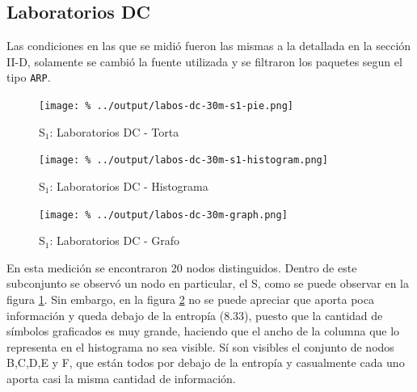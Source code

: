 \documentclass[final,inline,a4paper,narroweqnarray]{ieee}
\begin{document}
  \subsection{Laboratorios DC}

  Las condiciones en las que se midió fueron las mismas a la detallada
  en la sección II-D, solamente se cambió la fuente utilizada y se
  filtraron los paquetes segun el tipo \texttt{ARP}.

    \begin{figure}[H]\begin{center}
      \texttt{[image: \%
      ../output/labos-dc-30m-s1-pie.png]}
      \vspace{-2em}
      \caption{S$_1$: Laboratorios DC - Torta}
      \label{labos-dc-30m-s1-pie}
    \end{center}\end{figure}

    \begin{figure}[H]\begin{center}
      \texttt{[image: \%
      ../output/labos-dc-30m-s1-histogram.png]}
      \caption{S$_1$: Laboratorios DC - Histograma}
      \label{labos-dc-30m-s1-histogram}
    \end{center}\end{figure}
   
    \begin{figure}[H]\begin{center}
      \texttt{[image: \%
      ../output/labos-dc-30m-graph.png]}
      \caption{S$_1$: Laboratorios DC - Grafo}
      \label{labos-dc-30m-graph}
    \end{center}\end{figure}
  
  En esta medición se encontraron 20 nodos distinguidos. Dentro de
  este subconjunto se observó un nodo en particular, el S, como se
  puede observar en la figura \ref{labos-dc-30m-s1-pie}. Sin embargo,
  en la figura \ref{labos-dc-30m-s1-histogram} no se puede apreciar
  que aporta poca información y queda debajo de la entropía (8.33),
  puesto que la cantidad de símbolos graficados es muy grande,
  haciendo que el ancho de la columna que lo representa en el
  histograma no sea visible. Sí son visibles el conjunto de nodos
  B,C,D,E y F, que están todos por debajo de la entropía y casualmente
  cada uno aporta casi la misma cantidad de información.
\end{document}
